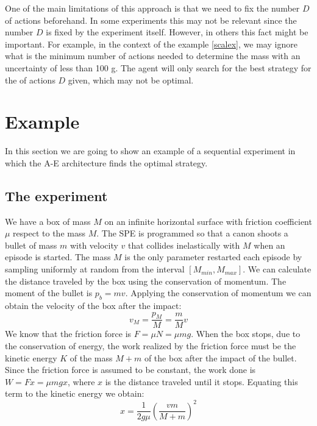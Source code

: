 \documentclass[11pt,a4paper,twoside]{report}
\newcommand{\+}{\textnormal{+} }
\theoremstyle{definition}
\numberwithin{equation}{chapter}
\begin{document}
One of the main limitations of this approach is that we need to fix the number
$D$ of actions beforehand. In some experiments this may not be relevant since
the number $D$ is fixed by the experiment itself. However, in others this fact
might be important. For example, in the context of the example \ref{scalex}, we
may ignore what is the minimum number of actions needed to determine the mass
with an uncertainty of less than 100 g. The agent will only search for the best
strategy for the of actions $D$ given, which may not be optimal.


\section{Example}

In this section we are going to show an example of a sequential experiment
in which the A-E architecture finds the optimal strategy.

\subsection{The experiment}

We have a box of mass $M$ on an infinite horizontal surface with friction
coefficient $\mu$ respect to the mass $M$. The SPE is programmed so that a canon
shoots a bullet of mass $m$ with velocity $v$ that collides inelastically with
$M$ when an episode is started. The mass $M$ is the only parameter restarted
each episode by sampling uniformly at random from the interval $[M_{min},
M_{max}]$. We can calculate the distance traveled by the box using the
conservation of momentum. The moment of the bullet is $p_b=mv$. Applying the
conservation of momentum we can obtain the velocity of the box after the impact:
\begin{equation}
  v_M = \frac{p_M}{M}=\frac{m}{M}v
\end{equation}
We know that the friction force is $F=\mu N=\mu mg$. When the box stops, due to
the conservation of energy, the work realized by the friction force must be the
kinetic energy $K$ of the mass $M+m$ of the box after the impact of the bullet.
Since the friction force is assumed to be constant, the work done is $W=Fx=\mu
mgx$, where $x$ is the distance traveled until it stops. Equating this term to
the kinetic energy we obtain:
\begin{equation}
  \label{displacement} 
  x=\frac{1}{2g\mu}\left(\frac{vm}{M+m} \right)^2
\end{equation}
\end{document}
